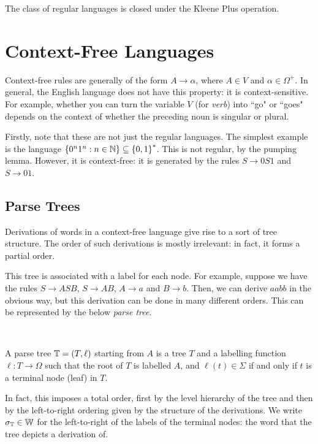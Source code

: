 \documentclass{article}
\begin{document}
\begin{corollary}
	The class of regular languages is closed under the Kleene Plus operation.
\end{corollary}

\pagebreak
\section{Context-Free Languages}

Context-free rules are generally of the form $A \to \alpha$, where $A \in V$ and $\alpha \in \Omega^+$. In general, the English language does not have this property: it is context-sensitive. For example, whether you can turn the variable $V$ (for \textit{verb}) into ``go" or ``goes" depends on the context of whether the preceding noun is singular or plural.

Firstly, note that these are not just the regular languages. The simplest example is the language $\left\lbrace 0^n1^n : n \in \mathbb{N} \right\rbrace \subseteq \left\lbrace 0, 1 \right\rbrace^*$. This is not regular, by the pumping lemma. However, it is context-free: it is generated by the rules $S \to 0S1$ and $S \to 01$.

\subsection{Parse Trees}

Derivations of words in a context-free language give rise to a sort of tree structure. The order of such derivations is mostly irrelevant: in fact, it forms a partial order.

This tree is associated with a label for each node. For example, suppose we have the rules $S \to ASB$, $S \to AB$, $A \to a$ and $B \to b$. Then, we can derive $aabb$ in the obvious way, but this derivation can be done in many different orders. This can be represented by the below \textit{parse tree}.

\  \

A parse tree $\mathbb{T} = (T, \ell)$ starting from $A$ is a tree $T$ and a labelling function $\ell : T \to \Omega$ such that the root of $T$ is labelled $A$, and $\ell(t) \in \Sigma$ if and only if $t$ is a terminal node (leaf) in $T$.

In fact, this imposes a total order, first by the level hierarchy of the tree and then by the left-to-right ordering given by the structure of the derivations. We write $\sigma_{\mathbb{T}} \in \mathbb{W}$ for the left-to-right of the labels of the terminal nodes: the word that the tree depicts a derivation of.
\end{document}
